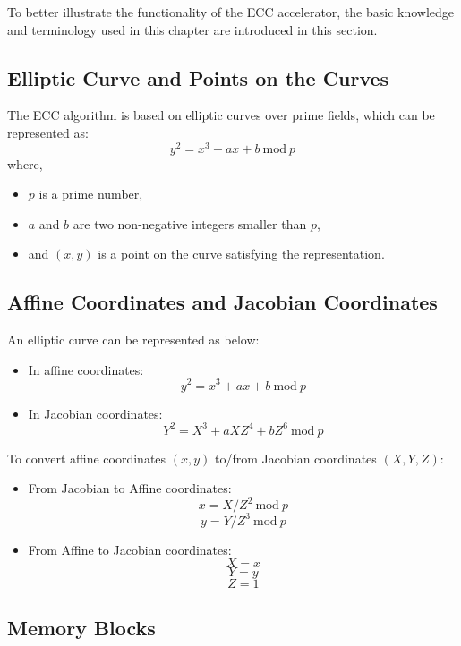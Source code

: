 \documentclass[main\_\_EN.tex]{subfiles}
\begin{document}
To better illustrate the functionality of the ECC accelerator, the basic knowledge and terminology used in this chapter are introduced in this section.

\subsection{Elliptic Curve and Points on the Curves}

The ECC algorithm is based on elliptic curves over prime fields, which can be represented as:
\[
{y}^{2} = {x}^{3} + {ax} + b \ \textrm{mod}\ p
\]
where,
\begin{itemize}
    \item $p$ is a prime number,
    \item $a$ and $b$ are two non-negative integers smaller than $p$,
    \item and $(x, y)$ is a point on the curve satisfying the representation.
\end{itemize}


\subsection{Affine Coordinates and Jacobian Coordinates}

An elliptic curve can be represented as below:

\begin{itemize}
    \item In affine coordinates:
    \[
    {y}^{2} = {x}^{3} + {ax} + b \ \textrm{mod}\ p
    \]
    \item In Jacobian coordinates:
    \[
    {Y}^{2} = {X}^{3} + {aXZ}^{4} + {bZ}^{6} \ \textrm{mod}\ p
    \]
\end{itemize}

To convert affine coordinates $(x,y)$ to/from Jacobian coordinates $(X,Y,Z)$:

\begin{itemize}
    \item From Jacobian to Affine coordinates:
    \[
    x = X / {Z}^2 \ \textrm{mod}\ p
    \]
    \[
    y = Y / {Z}^3 \ \textrm{mod}\ p
    \]
    \item From Affine to Jacobian coordinates:
    \[ X = x \]
    \[ Y = y \]
    \[ Z = 1\]
\end{itemize}

\subsection{Memory Blocks}
\end{document}
